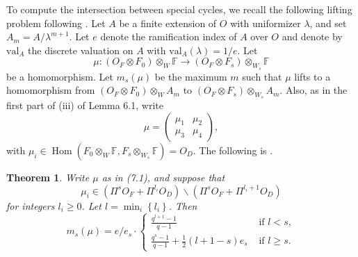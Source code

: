 \documentclass[11pt,oneside]{amsart}
\newcommand{\val}{{\mathrm{val}}}
\theoremstyle{plain}
\newtheorem{theorem}{Theorem}[section]
\theoremstyle{definition}
\theoremstyle{remark}
\numberwithin{equation}{section}
\begin{document}
To compute the intersection between special cycles, we recall the following lifting problem following \cite[\S 7]{KR1}.  Let $A$ be a finite extension of $O$ with uniformizer $\lambda$, and set $A_m=A / \lambda^{m+1}$. Let $e$ denote the ramification index of $A$ over $O$ and denote by $\val_A$ the discrete valuation on $A$ with $\val_A(\lambda)=1 / e$.   Let
$$
\mu:\left(O_F \otimes F_0\right) \otimes_W \mathbb{F} \longrightarrow\left(O_F \otimes F_s\right) \otimes_{W_s} \mathbb{F}
$$
be a homomorphism. Let $m_s(\mu)$ be the maximum $m$ such that $\mu$ lifts to a homomorphism from $\left(O_F \otimes F_0\right) \otimes_W A_m$ to $\left(O_F \otimes F_s\right) \otimes_{W_s} A_m$. Also, as in the first part of (iii) of Lemma 6.1, write
$$
\mu=\left(\begin{array}{ll}
	\mu_1 & \mu_2 \\
	\mu_3 & \mu_4
\end{array}\right),
$$
with $\mu_i \in \operatorname{Hom}\left(F_0 \otimes_W \mathbb{F}, F_s \otimes_{W_s} \mathbb{F}\right)=O_D$.
The following is \cite[Theorem 7.1]{KR1}.
\begin{theorem}\label{thm: lifting}
 Write $\mu$ as in (7.1), and suppose that
$$
\mu_i \in\left(\Pi^s O_F+\Pi^{l_i} O_D\right) \backslash\left(\Pi^s O_F+\Pi^{l_i+1} O_D\right)
$$
for integers $l_i \geq 0$. Let $l=\min _i\left\{l_i\right\}$. Then
$$
m_s(\mu)=e / e_s \cdot\left\{\begin{array}{ll}
	\frac{q^{l+1}-1}{q-1} & \text { if } l<s, \\
	\frac{q^s-1}{q-1}+\frac{1}{2}(l+1-s) e_s & \text { if } l \geq s .
\end{array}\right.
$$
\end{theorem}
\end{document}
